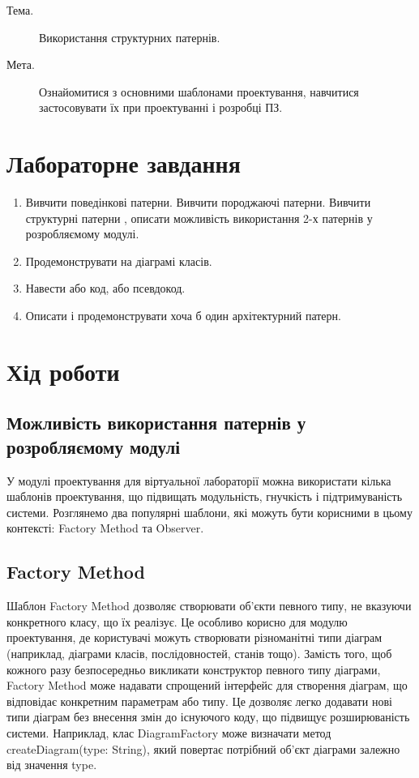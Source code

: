 \documentclass[oneside,14pt]{extarticle}
\newcommand\theme{Використання структурних патернів}
\newcommand\purpose{Ознайомитися з основними шаблонами проектування, навчитися застосовувати їх при проектуванні і розробці ПЗ}
\begin{document}
\begin{normalsize}
	\begin{description}
		\item[Тема.] \theme.
		\item[Мета.] \purpose.
	\end{description}

    \section*{Лабораторне завдання}
    \begin{enumerate}
    	\item Вивчити поведінкові патерни. Вивчити породжаючі патерни. Вивчити структурні патерни , описати можливість використання 2-х патернів у розробляємому модулі.
    	\item Продемонструвати на діаграмі класів.
    	\item Навести або код, або псевдокод.
    	\item Описати і продемонструвати хоча б один архітектурний патерн.
    \end{enumerate}
    
    \section*{Хід роботи}
    \subsection*{Можливість використання патернів у розробляємому модулі}
    У модулі проектування для віртуальної лабораторії можна використати кілька шаблонів проектування, що підвищать модульність, гнучкість і підтримуваність системи. Розглянемо два популярні шаблони, які можуть бути корисними в цьому контексті: Factory Method та Observer.
    
    \subsection*{Factory Method}
    Шаблон Factory Method дозволяє створювати об'єкти певного типу, не вказуючи конкретного класу, що їх реалізує. Це особливо корисно для модулю проектування, де користувачі можуть створювати різноманітні типи діаграм (наприклад, діаграми класів, послідовностей, станів тощо). Замість того, щоб кожного разу безпосередньо викликати конструктор певного типу діаграми, Factory Method може надавати спрощений інтерфейс для створення діаграм, що відповідає конкретним параметрам або типу. Це дозволяє легко додавати нові типи діаграм без внесення змін до існуючого коду, що підвищує розширюваність системи. Наприклад, клас DiagramFactory може визначати метод createDiagram(type: String), який повертає потрібний об'єкт діаграми залежно від значення type.
    

\end{normalsize}
\end{document}
